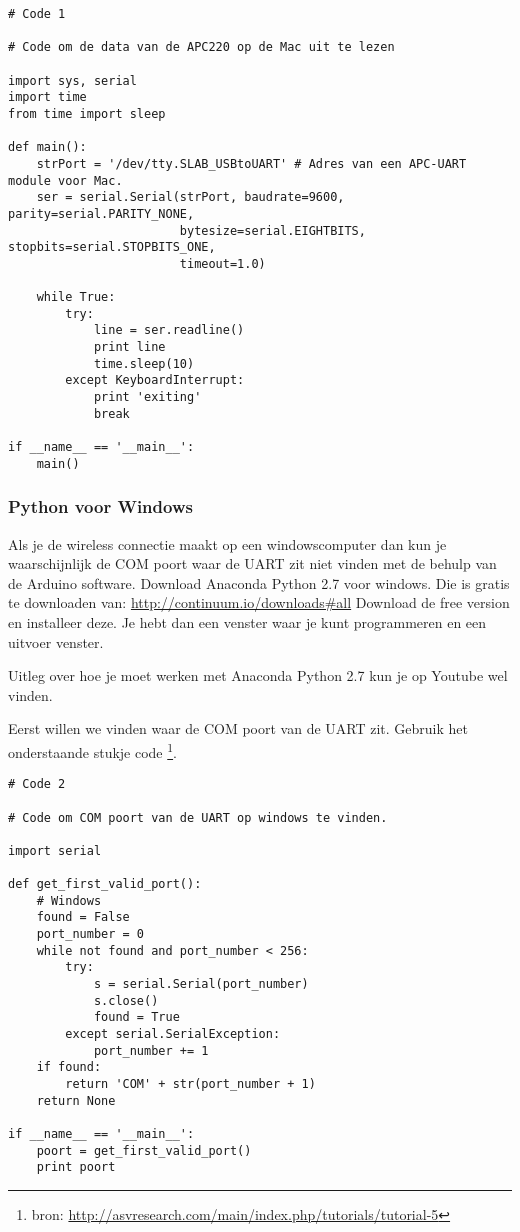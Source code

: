 \begin{verbatim}
# Code 1

# Code om de data van de APC220 op de Mac uit te lezen

import sys, serial
import time
from time import sleep
      
def main():
    strPort = '/dev/tty.SLAB_USBtoUART' # Adres van een APC-UART module voor Mac. 
    ser = serial.Serial(strPort, baudrate=9600, parity=serial.PARITY_NONE, 
                        bytesize=serial.EIGHTBITS, stopbits=serial.STOPBITS_ONE,
                        timeout=1.0)
    
    while True:
        try:
            line = ser.readline()
            print line
            time.sleep(10)
        except KeyboardInterrupt:
            print 'exiting'
            break

if __name__ == '__main__':
    main()
\end{verbatim}


\subsubsection{Python voor Windows}

Als je de wireless connectie maakt op een windowscomputer dan kun je 
waarschijnlijk de COM poort waar de UART zit niet vinden met de behulp van de 
Arduino software. Download Anaconda Python 2.7 voor windows.
Die is gratis te downloaden van: \url{http://continuum.io/downloads#all}
Download de free version en installeer deze. Je hebt dan een venster waar je kunt
programmeren en een uitvoer venster.

Uitleg over hoe je moet werken met Anaconda Python 2.7 kun je op Youtube wel vinden.

Eerst willen we vinden waar de COM poort van de UART zit. Gebruik het onderstaande 
stukje code \footnote{bron: \url{http://asvresearch.com/main/index.php/tutorials/tutorial-5}}.

\begin{verbatim}
# Code 2

# Code om COM poort van de UART op windows te vinden.

import serial
 
def get_first_valid_port():
    # Windows
    found = False
    port_number = 0
    while not found and port_number < 256:
        try:
            s = serial.Serial(port_number)
            s.close()
            found = True
        except serial.SerialException:
            port_number += 1
    if found:
        return 'COM' + str(port_number + 1)
    return None

if __name__ == '__main__': 
    poort = get_first_valid_port()
    print poort
\end{verbatim}

